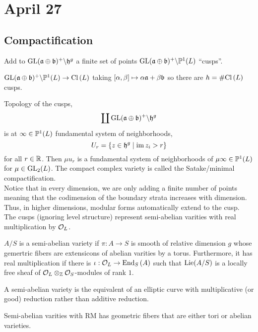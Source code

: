 \documentclass[12pt]{article}
\begin{document}
\section{April 27}

\subsection{Compactification}

Add to $\GL(\a \oplus \b)^+ \backslash \h^g$ a finite set of points $\GL(\a \oplus \b)^+ \backslash \P^1(L)$ ``cusps''.

\begin{prop}
$\GL(\a \oplus \b)^+ \backslash \P^1(L) \to \Cl{L}$ taking $[\alpha, \beta] \mapsto \alpha \a + \beta \b$ so there are $h = \# \Cl{L}$ cusps.
\end{prop}

Topology of the cusps,
\[ \coprod \GL(\a \oplus \b)^+ \backslash \h^g \]
is at $\infty \in \P^1(L)$ fundamental system of neighborhoods,
\[ U_r = \{ z \in \h^g \mid \im{z_i} > r \} \]
for all $r \in \RR$. Then $\mu u_r$ is a fundamental system of neighborhoods of $\mu \infty \in \P^1(L)$ for $\mu \in \GL_2(L)$. The compact complex variety is called the Satake/minimal compactification.
\bigskip\\
Notice that in every dimension, we are only adding a finite number of points meaning that the codimension of the boundary strata increases with dimension. Thus, in higher dimensions, modular forms automatically extend to the cusp. 
\bigskip\\
The cusps (ignoring level structure) represent semi-abelian varities with real multiplication by $\struct{L}$.

\begin{defn}
$A/S$ is a semi-abelian variety if $\pi : A \to S$ is smooth of relative dimension $g$ whose gemertric fibers are extensicons of abelian varities by a torus. Furthermore, it has real multiplication if there is $\iota : \struct{L} \to \End[S]{A}$ such that $\Lie(A/S)$ is a locally free sheaf of $\struct{L} \ot_{\Z} \struct{S}$-modules of rank $1$.
\end{defn}

\begin{rmk}
A semi-abelian variety is the equivalent of an elliptic curve with multiplicative (or good) reduction rather than additive reduction. 
\end{rmk}

\begin{lemma}
Semi-abelian varities with RM has geometric fibers that are either tori or abelian varieties.
\end{lemma}
\end{document}
